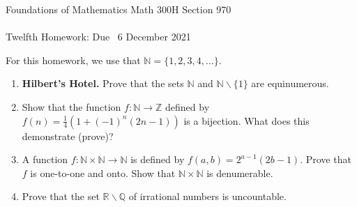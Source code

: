 \documentclass[12pt]{article}
\newcommand{\RR}{{\mathbb R}}  %
\newcommand{\NN}{{\mathbb N}}  %
\newcommand{\QQ}{{\mathbb Q}}  %
\newcommand{\ZZ}{{\mathbb Z}}  %
\begin{document}
\LARGE 
\noindent
{\color{Maroon}Foundations of Mathematics \hfill Math 300H Section 970}\vspace{2pt}\\
\Large \vspace{2pt}\\
\large
Twelfth Homework: \hfill Due \  6 December 2021
\normalsize\medskip


\noindent{\color{blue}\rule{528.3675pt}{2pt}}

For this homework, we use that $\NN=\{1,2,3,4,\dotsc\}$.

\noindent{\color{blue}\rule{528.3675pt}{2pt}}


\begin{enumerate}  %



\item {\bf Hilbert's Hotel.}
      Prove that the sets $\NN$ and $\NN\smallsetminus\{1\}$ are equinumerous.



\item Show that the function $f\colon\NN\to\ZZ$ defined by $f(n)=\frac{1}{4}(1+(-1)^n(2n-1))$ is a bijection.
       What does this demonstrate (prove)?


\item A function $f\colon\NN\times\NN\to\NN$ is defined by $f(a,b)=2^{a-1}(2b-1)$.
       Prove that $f$ is one-to-one and onto.
       Show that $\NN\times\NN$ is denumerable.



\item Prove that the set  $\RR\smallsetminus\QQ$ of irrational numbers is uncountable.




\end{enumerate}
\end{document}

